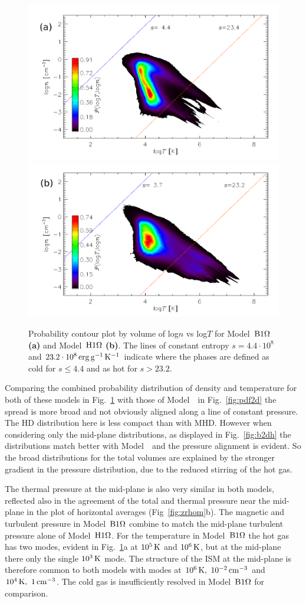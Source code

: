 \documentclass[useAMS,usenatbib]{mn2e}
\begin{document}
  \begin{figure}
  \centering
  \includegraphics[width=0.475\linewidth]{fig/o1pr_pdf2dtn.png}  
  \includegraphics[width=0.475\linewidth]{fig/o1ph_pdf2dtn.png}
    \caption[2D probability distribution of $n$ and $T$ for Models~$\Ompa$ and $\Omph$]{
  Probability contour plot by volume of log$n$ vs log$T$ for Model~$\Ompa$
  {\textbf{(a)}}
  and Model~$\Omph$ {\textbf{(b)}}.
  The lines of constant entropy $s=4.4\cdot10^{8}$ 
  and $23.2\cdot10^{8}\,{\rm erg}\,{\rm g}^{-1}\,{\rm K}^{-1}$ indicate where the phases are defined
  as cold for $s\le4.4$ and as hot for $s>23.2$. 
  \label{fig:b2dv}
    }
  \end{figure}

Comparing the combined probability distribution of density and temperature for both of these models in Fig.~\ref{fig:b2dv} with those of Model~\Op\ in Fig.~\ref{fig:pdf2d} the spread is more broad and not obviously aligned along a line of constant pressure.
The HD distribution here is less compact than with MHD.  However when considering only the mid-plane distributions, as displayed in Fig.~\ref{fig:b2dh} the distributions match better with Model~\Op\ and the pressure alignment is evident. So the broad distributions for the total volumes are explained by the stronger gradient in the pressure distribution, due to the reduced stirring of the hot gas.

The thermal pressure at the mid-plane is also very similar in both models,  reflected also in the agreement of the total and thermal pressure near the  mid-plane in the plot of horizontal averages (Fig~\ref{fig:zrhom}b). The magnetic and turbulent pressure in Model~$\Ompa$ combine to match the mid-plane turbulent pressure alone of Model~$\Omph$.
For the temperature in Model~$\Ompa$ the hot gas has two modes, evident in Fig.~\ref{fig:b2dv}a at $10^5\,{\rm K}$ and $10^6\,{\rm K}$, but at the mid-plane there only the single $10^3\,{\rm K}$ mode. The structure of the ISM at the mid-plane is therefore common to both models with modes at $10^6\,{\rm K},~10^{-2}\,{\rm cm^{-3}}$ and $10^4\,{\rm K},~1\,{\rm cm^{-3}}$.
The cold gas is insufficiently resolved in Model~$\Ompa$ for comparison.   
\end{document}
